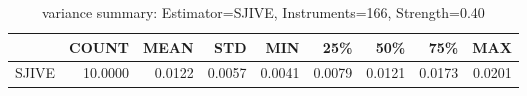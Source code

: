 \begin{table}[ht]
\centering
\caption{variance summary: Estimator=SJIVE, Instruments=166, Strength=0.40}
\begin{tabular}{lrrrrrrrr}
\toprule
 & COUNT & MEAN & STD & MIN & 25\% & 50\% & 75\% & MAX \\
\midrule
SJIVE & 10.0000 & 0.0122 & 0.0057 & 0.0041 & 0.0079 & 0.0121 & 0.0173 & 0.0201 \\
\bottomrule
\end{tabular}
\end{table}
